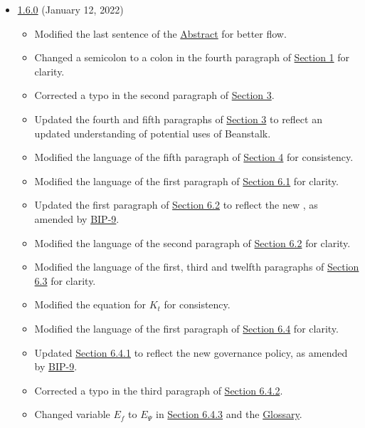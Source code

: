 \documentclass[class=article, crop=false]{standalone}
\begin{document}
\begin{itemize}[topsep=0pt, itemsep=3pt,leftmargin=16pt]
\begin{itemize}
    \end{itemize}
    \item \href{https://github.com/BeanstalkFarms/Beanstalk/blob/master/version-history/beanstalk1_6_0.pdf}{1.6.0} (January 12, 2022)
    \begin{itemize}
        \item Modified the last sentence of the \hyperlink{abstract}{Abstract} for better flow.
        \item Changed a semicolon to a colon in the fourth paragraph of \hyperlink{section.1}{Section 1} for clarity.
        \item Corrected a typo in the second paragraph of \hyperlink{section.3}{Section 3}.
        \item Updated the fourth and fifth paragraphs of \hyperlink{section.3}{Section 3} to reflect an updated understanding of potential uses of Beanstalk.
        \item Modified the language of the fifth paragraph of \hyperlink{section.4}{Section 4} for consistency.
        \item Modified the language of the first paragraph of \hyperlink{subsection.6.1}{Section 6.1} for clarity.
        \item Updated the first paragraph of \hyperlink{subsection.6.2}{Section 6.2} to reflect the new  , as amended by \href{https://github.com/BeanstalkFarms/Beanstalk-Governance-Proposals/blob/master/bip/bip-09-efficiency-improvements.md}{BIP-9}.
        \item Modified the language of the second paragraph of \hyperlink{subsection.6.2}{Section 6.2} for clarity.
        \item Modified the language of the first, third and twelfth paragraphs of \hyperlink{subsection.6.3}{Section 6.3} for clarity.
        \item Modified the equation for $K_t$ for consistency.
        \item Modified the language of the first paragraph of \hyperlink{subsection.6.4}{Section 6.4} for clarity.
        \item Updated \hyperlink{subsubsection.6.4.1}{Section 6.4.1} to reflect the new governance policy, as amended by \href{https://github.com/BeanstalkFarms/Beanstalk-Governance-Proposals/blob/master/bip/bip-09-efficiency-improvements.md}{BIP-9}.
        \item Corrected a typo in the third paragraph of \hyperlink{subsubsection.6.4.2}{Section 6.4.2}.
        \item Changed variable $E_f$ to $E_{\Psi}$ in \hyperlink{subsubsection.6.4.3}{Section 6.4.3} and the \hyperlink{subsection.12.2}{Glossary}.

\end{itemize}
\end{itemize}
\end{document}
